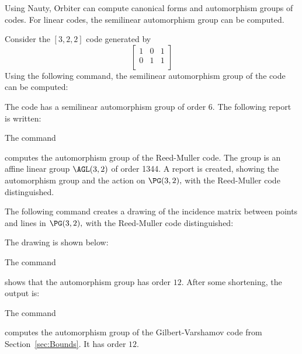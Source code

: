 Using Nauty, 
Orbiter can compute canonical forms and 
automorphism groups of codes.
For linear codes, 
the semilinear automorphism group can be computed.

\bigskip


Consider the $[3,2,2]$ code generated by 
$$
\left[
\begin{array}{ccc}
	1&0&1\\
	0&1&1\\
\end{array}
\right]
$$
Using the following command, 
the semilinear automorphism group of the code 
can be computed:




The code has a semilinear automorphism group of order 6.
The following report is written:

\bigskip




The command 




computes the automorphism group of the Reed-Muller code. 
The group is an affine linear group $\AGL(3,2)$ of order 1344. 
A report is created, showing the automorphism group 
and the action on $\PG(3,2),$ with the Reed-Muller code distinguished.


\bigskip

The following command creates a drawing of the incidence matrix between points 
and lines in $\PG(3,2),$ 
with the Reed-Muller code distinguished:

The drawing is shown below:


\bigskip




The command 


shows that the automorphism group has order $12$.
After some shortening, the output is:

\bigskip


The command 


computes the automorphism group of the Gilbert-Varshamov code from Section~\ref{sec:Bounds}. 
It has order $12$.

\bigskip

